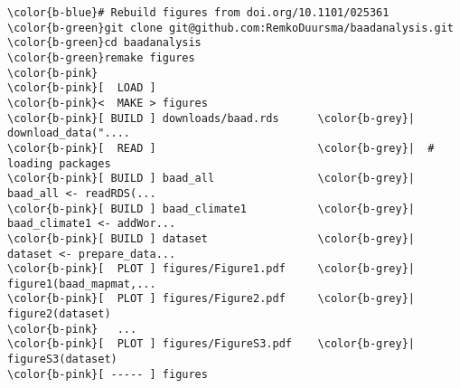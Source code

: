 \documentclass[class=minimal,border=0]{standalone}
\begin{document}
%
\begin{BVerbatim}[bgcolor=b-darkgrey]
\color{b-blue}# Rebuild figures from doi.org/10.1101/025361
\color{b-green}git clone git@github.com:RemkoDuursma/baadanalysis.git 
\color{b-green}cd baadanalysis 
\color{b-green}remake figures
\color{b-pink}
\color{b-pink}[  LOAD ] 
\color{b-pink}<  MAKE > figures
\color{b-pink}[ BUILD ] downloads/baad.rds      \color{b-grey}|  download_data("....
\color{b-pink}[  READ ]                         \color{b-grey}|  # loading packages
\color{b-pink}[ BUILD ] baad_all                \color{b-grey}|  baad_all <- readRDS(...
\color{b-pink}[ BUILD ] baad_climate1           \color{b-grey}|  baad_climate1 <- addWor...
\color{b-pink}[ BUILD ] dataset                 \color{b-grey}|  dataset <- prepare_data...
\color{b-pink}[  PLOT ] figures/Figure1.pdf     \color{b-grey}|  figure1(baad_mapmat,...
\color{b-pink}[  PLOT ] figures/Figure2.pdf     \color{b-grey}|  figure2(dataset) 
\color{b-pink}   ...
\color{b-pink}[  PLOT ] figures/FigureS3.pdf    \color{b-grey}|  figureS3(dataset)
\color{b-pink}[ ----- ] figures
\end{BVerbatim}
\end{document}
